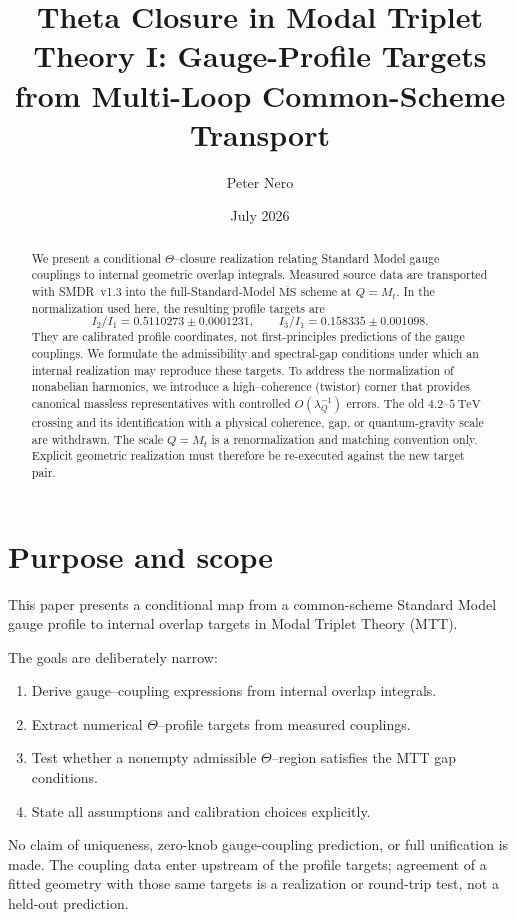 \documentclass[11pt]{article}
\title{Theta Closure in Modal Triplet Theory I:
Gauge-Profile Targets from Multi-Loop Common-Scheme Transport}
\author{Peter Nero}
\date{July 2026}
\begin{document}
\maketitle
\begin{abstract}
We present a conditional $\Theta$--closure realization relating Standard Model
gauge couplings to internal geometric overlap integrals.  Measured source data
are transported with SMDR~v1.3 into the full-Standard-Model
$\overline{\mathrm{MS}}$ scheme at $Q=M_t$.  In the normalization used here,
the resulting profile targets are
\[
 I_2/I_1=0.5110273\pm0.0001231,\qquad
 I_3/I_1=0.158335\pm0.001098.
\]
They are calibrated profile coordinates, not first-principles predictions of
the gauge couplings.  We formulate the admissibility and spectral-gap
conditions under which an internal realization may reproduce these targets.
To address the normalization of nonabelian harmonics, we introduce a
high--coherence (twistor) corner that provides canonical massless representatives
with controlled $O(\lambda_Q^{-1})$ errors.
The old $4.2$--$5~\mathrm{TeV}$ crossing and its identification with a physical
coherence, gap, or quantum-gravity scale are withdrawn.  The scale $Q=M_t$ is a
renormalization and matching convention only.  Explicit geometric realization
must therefore be re-executed against the new target pair.
\end{abstract}

\section{Purpose and scope}

This paper presents a conditional map from a common-scheme Standard Model gauge
profile to internal overlap targets in Modal Triplet Theory (MTT).

The goals are deliberately narrow:
\begin{enumerate}
\item Derive gauge--coupling expressions from internal overlap integrals.
\item Extract numerical $\Theta$--profile targets from measured couplings.
\item Test whether a nonempty admissible $\Theta$--region satisfies the MTT gap conditions.
\item State all assumptions and calibration choices explicitly.
\end{enumerate}

No claim of uniqueness, zero-knob gauge-coupling prediction, or full
unification is made.  The coupling data enter upstream of the profile targets;
agreement of a fitted geometry with those same targets is a realization or
round-trip test, not a held-out prediction.
\end{document}
